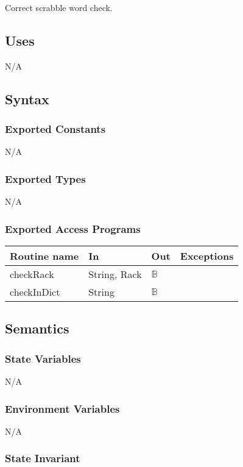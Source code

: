 \documentclass[12pt]{article}
\begin{document}
Correct scrabble word check.

\subsection* {Uses}

N/A

\subsection* {Syntax}

\subsubsection* {Exported Constants}
N/A
\subsubsection* {Exported Types}

N/A

\subsubsection* {Exported Access Programs}

\begin{tabular}{| l | l | l | l |}
\hline
\textbf{Routine name} & \textbf{In} & \textbf{Out} & \textbf{Exceptions}\\
\hline
checkRack & String, Rack & $\mathbb{B}$ & \\
\hline
checkInDict & String & $\mathbb{B}$ & \\
\hline
\end{tabular}

\subsection* {Semantics}

\subsubsection* {State Variables}

N/A

\subsubsection* {Environment Variables}

N/A

\subsubsection* {State Invariant}
\end{document}
